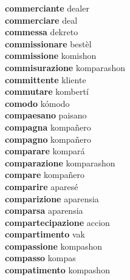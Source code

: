 \textbf{commerciante } dealer \\
\textbf{commerciare } deal \\
\textbf{commessa } dekreto \\
\textbf{commissionare } bestèl \\
\textbf{commissione } komishon \\
\textbf{commisurazione } komparashon \\
\textbf{committente } kliente \\
\textbf{commutare } kombertí \\
\textbf{comodo } kómodo \\
\textbf{compaesano } paisano \\
\textbf{compagna } kompañero \\
\textbf{compagno } kompañero \\
\textbf{comparare } kompará \\
\textbf{comparazione } komparashon \\
\textbf{compare } kompañero \\
\textbf{comparire } aparesé \\
\textbf{comparizione } aparensia \\
\textbf{comparsa } aparensia \\
\textbf{compartecipazione } accion \\
\textbf{compartimento } vak \\
\textbf{compassione } kompashon \\
\textbf{compasso } kompas \\
\textbf{compatimento } kompashon \\

